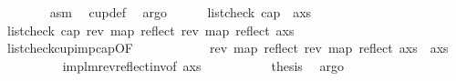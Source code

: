 \begin{isabellebody}
\ \ \ \ \ \ \isamarkupfalse%
\ asm\ \isamarkupfalse%
\ cup{\isacharunderscore}{\kern0pt}def\ \isamarkupfalse%
\ argo\isanewline
\ \ \ \ \isamarkupfalse%
\ {\isachardoublequoteopen}list{\isacharunderscore}{\kern0pt}check\ cap{}\ \ {\isacharparenleft}{\kern0pt}a{\isacharhash}{\kern0pt}xs{\isacharparenright}{\kern0pt}{\isachardoublequoteclose}\ \isanewline
\ \ \ \ \isamarkupfalse%
{\isacharminus}{\kern0pt}\isanewline
\ \ \ \ \ \ \isamarkupfalse%
\ {\isachardoublequoteopen}list{\isacharunderscore}{\kern0pt}check\ cap{}\ {\isacharparenleft}{\kern0pt}rev\ {\isacharparenleft}{\kern0pt}map\ reflect\ {\isacharparenleft}{\kern0pt}rev\ {\isacharparenleft}{\kern0pt}map\ reflect\ {\isacharparenleft}{\kern0pt}a{\isacharhash}{\kern0pt}xs{\isacharparenright}{\kern0pt}{\isacharparenright}{\kern0pt}{\isacharparenright}{\kern0pt}{\isacharparenright}{\kern0pt}{\isacharparenright}{\kern0pt}{\isachardoublequoteclose}\isanewline
\ \ \ \ \ \ \ \ \isamarkupfalse%
\ list{\isacharunderscore}{\kern0pt}check{\isacharunderscore}{\kern0pt}cup{}{\isacharunderscore}{\kern0pt}imp{\isacharunderscore}{\kern0pt}cap{}{\isacharbrackleft}{\kern0pt}OF\ {}{\isacharbrackright}{\kern0pt}\ \isakeywordONE{{\isachardot}{\kern0pt}}\isamarkupfalse%
\isanewline
\ \ \ \ \ \ \isamarkupfalse%
\ \isamarkupfalse%
\ {\isachardoublequoteopen}{\isacharparenleft}{\kern0pt}rev\ {\isacharparenleft}{\kern0pt}map\ reflect\ {\isacharparenleft}{\kern0pt}rev\ {\isacharparenleft}{\kern0pt}map\ reflect\ {\isacharparenleft}{\kern0pt}a{\isacharhash}{\kern0pt}xs{\isacharparenright}{\kern0pt}{\isacharparenright}{\kern0pt}{\isacharparenright}{\kern0pt}{\isacharparenright}{\kern0pt}{\isacharparenright}{\kern0pt}\ {\isacharequal}{\kern0pt}\ a{\isacharhash}{\kern0pt}xs{\isachardoublequoteclose}\isanewline
\ \ \ \ \ \ \ \ \isamarkupfalse%
\ implm{\isacharunderscore}{\kern0pt}rev{\isacharunderscore}{\kern0pt}reflect{\isacharunderscore}{\kern0pt}inv{\isacharbrackleft}{\kern0pt}of\ {\isachardoublequoteopen}a{\isacharhash}{\kern0pt}xs{\isachardoublequoteclose}{\isacharbrackright}{\kern0pt}\ \isakeywordONE{{\isachardot}{\kern0pt}}\isamarkupfalse%
\isanewline
\ \ \ \ \ \ \isamarkupfalse%
\ \isamarkupfalse%
\ {\isacharquery}{\kern0pt}thesis\ \isamarkupfalse%
\ argo\isanewline
\ \ \ \ \isamarkupfalse%

\end{isabellebody}
